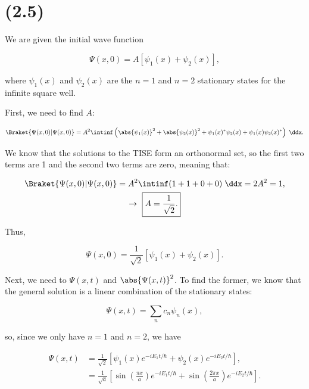 \section{(2.5)}

We are given the initial wave function

\begin{equation}
    \Psi(x,0) = A[\psi_1(x) + \psi_2(x)],
\end{equation}

where $\psi_1(x)$ and $\psi_2(x)$ are the $n=1$ and $n=2$ stationary states for the infinite square well.

\begin{parts}

\item First, we need to find $A$:

\begin{equation*}
    \Braket{\Psi(x,0) | \Psi(x,0)} = A^2 \intinf \left( \abs{\psi_1(x)}^2 + \abs{\psi_2(x)}^2 + \psi_1(x)^*\psi_2(x) + \psi_1(x)\psi_2(x)^* \right) \;\ddx.
\end{equation*}

We know that the solutions to the TISE form an orthonormal set, so the first two terms are 1 and the second two terms are zero, meaning that:

\begin{gather*}
    \Braket{\Psi(x,0) | \Psi(x,0)} = A^2 \intinf (1 + 1 + 0 + 0) \;\ddx = 2A^2 = 1, \\
    \rightarrow\ \boxed{A = \frac{1}{\sqrt{2}}.}
\end{gather*}

Thus,

\begin{equation*}
    \boxed{\Psi(x,0) = \frac{1}{\sqrt{2}}[\psi_1(x) + \psi_2(x)].}
\end{equation*}



\item Next, we need to $\Psi(x,t)$ and $\abs{\Psi(x,t)}^2$. To find the former, we know that the general solution is a linear combination of the stationary states:

\begin{equation*}
    \Psi(x,t) = \sum_n c_n \psi_n(x),
\end{equation*}

so, since we only have $n=1$ and $n=2$, we have

\begin{align*}
    \Psi(x,t) &= \frac{1}{\sqrt{2}} \left[ \psi_1(x)e^{-iE_1t/\hbar} + \psi_2(x)e^{-iE_2t/\hbar} \right], \\
    &= \frac{1}{\sqrt{a}} \left[ \sin\left( \frac{\pi x}{a} \right)e^{-iE_1t/\hbar} + \sin\left( \frac{2\pi x}{a} \right)e^{-iE_2t/\hbar} \right].
\end{align*}


\end{parts}
